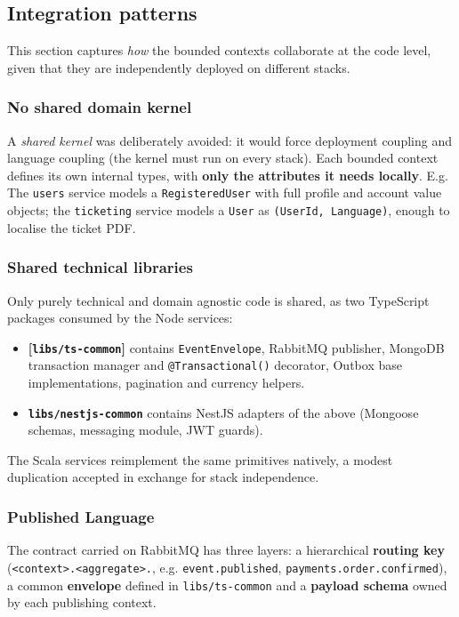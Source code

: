 \subsection{Integration patterns}

This section captures \textit{how} the bounded contexts collaborate at the code level, given that they are independently deployed on different stacks.

\subsubsection{No shared domain kernel}

A \textit{shared kernel} was deliberately avoided: it would force deployment coupling and language coupling (the kernel must run on every stack). Each bounded context defines its own internal types, with \textbf{only the attributes it needs locally}. E.g. The \texttt{users} service models a \texttt{RegisteredUser} with full profile and account value objects; the \texttt{ticketing} service models a \texttt{User} as \texttt{(UserId, Language)}, enough to localise the ticket PDF.

\subsubsection{Shared technical libraries}

Only purely technical and domain agnostic code is shared, as two TypeScript packages consumed by the Node services:

\begin{itemize}
  \item \textbf{[\texttt{libs/ts-common}]} contains \texttt{EventEnvelope}, RabbitMQ publisher, MongoDB transaction manager and \texttt{@Transactional()} decorator, Outbox base implementations, pagination and currency helpers.
  \item \textbf{\texttt{libs/nestjs-common}} contains NestJS adapters of the above (Mongoose schemas, messaging module, JWT guards).
\end{itemize}

The Scala services reimplement the same primitives natively, a modest duplication accepted in exchange for stack independence.

\subsubsection{Published Language}

The contract carried on RabbitMQ has three layers: a hierarchical \textbf{routing key} (\texttt{<context>.\allowbreak<aggregate>.}, e.g. \texttt{event.\allowbreak published}, \texttt{payments.\allowbreak order.\allowbreak confirmed}), a common \textbf{envelope} defined in \texttt{libs/ts-common} and a \textbf{payload schema} owned by each publishing context.

